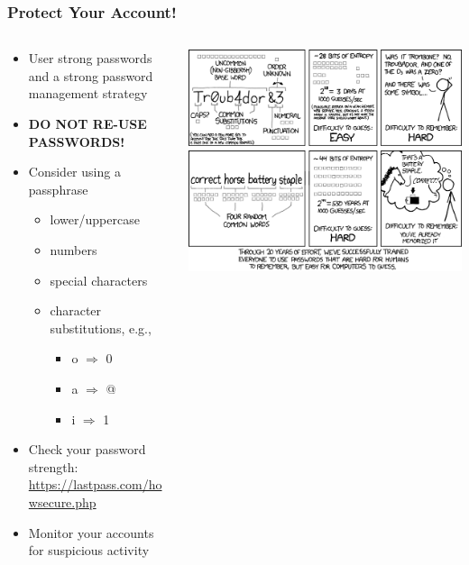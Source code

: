 \begin{frame}
  \frametitle{Protect Your Account!}
\begin{columns}
\begin{column}{0.45\textwidth}
\begin{block}{}
  \begin{itemize}
  \item User strong passwords and a strong password management strategy
  \item \textbf{DO NOT RE-USE PASSWORDS!}
  \item Consider using a passphrase
    \begin{itemize}
    \item lower/uppercase
    \item numbers
    \item special characters
    \item character substitutions, e.g.,
      \begin{itemize}
      \item o $\Longrightarrow$ 0
      \item a $\Longrightarrow$ @
      \item i $\Longrightarrow$ 1
      \end{itemize}
    \end{itemize}
  \item Check your password strength: \href{https://lastpass.com/howsecure.php}{https://lastpass.com/howsecure.php}
  \item Monitor your accounts for suspicious activity
  \end{itemize}
  \end{block}
\end{column}
\begin{column}{0.49\textwidth}
\begin{block}{}
  \includegraphics[scale=0.25]{password_strength.png}
\end{block}
\end{column}
\end{columns}
\end{frame}  


